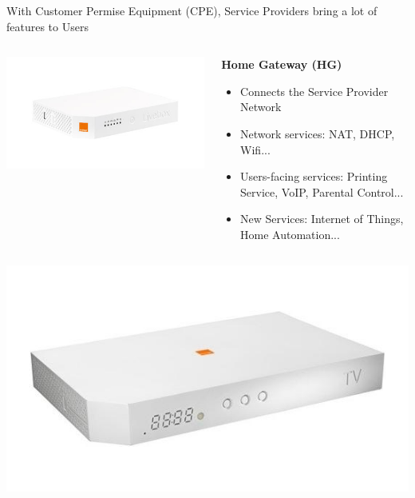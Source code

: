 \documentclass[a4paper]{beamer}
\begin{document}
\begin{frame}{With Customer Permise Equipment (CPE), Service Providers bring a lot of features to Users}
		
	
	\begin{columns}[T] 
		\begin{column}[T]{0.25 \textwidth} 
			\includegraphics[width=\linewidth]{livebox.png}
		\end{column}
						
		\begin{column}[T]{0.75 \textwidth} 
									
			\textbf{Home Gateway  (HG)}
			\begin{itemize}
				\item Connects the Service Provider Network 
				\item Network services: NAT, DHCP, Wifi...
				\item Users-facing services: Printing Service, VoIP, Parental Control...
				\item New Services: Internet of Things, Home Automation...
			\end{itemize}
			\vspace{1em}
									
		\end{column}
						
	\end{columns}
		
		
			
		
	\begin{columns}[T] 
		\begin{column}[T]{0.25 \textwidth} 
			\includegraphics[width=\linewidth]{liveboxdec.png}
		\end{column}
						

\end{columns}
\end{frame}
\end{document}
